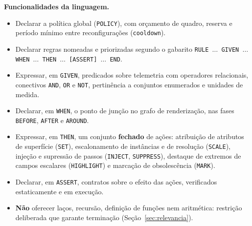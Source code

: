\documentclass[conference]{IEEEtran}
\begin{document}
\textbf{Funcionalidades da linguagem.}
\begin{itemize}
\item[\textbf{F1}] Declarar a política global (\texttt{POLICY}), com orçamento
de quadro, reserva e período mínimo entre reconfigurações
(\texttt{cooldown}).
\item[\textbf{F2}] Declarar regras nomeadas e priorizadas segundo o gabarito
\texttt{RULE $\dots$ GIVEN $\dots$ WHEN $\dots$ THEN $\dots$ [ASSERT] $\dots$
END}.
\item[\textbf{F3}] Expressar, em \texttt{GIVEN}, predicados sobre telemetria
com operadores relacionais, conectivos \texttt{AND}, \texttt{OR} e
\texttt{NOT}, pertinência a conjuntos enumerados e unidades de medida.
\item[\textbf{F4}] Declarar, em \texttt{WHEN}, o ponto de junção no grafo de
renderização, nas fases \texttt{BEFORE}, \texttt{AFTER} e \texttt{AROUND}.
\item[\textbf{F5}] Expressar, em \texttt{THEN}, um conjunto \textbf{fechado} de
ações: atribuição de atributos de superfície (\texttt{SET}), escalonamento de
instâncias e de resolução (\texttt{SCALE}), injeção e supressão de passos
(\texttt{INJECT}, \texttt{SUPPRESS}), destaque de extremos de campos escalares
(\texttt{HIGHLIGHT}) e marcação de obsolescência (\texttt{MARK}).
\item[\textbf{F6}] Declarar, em \texttt{ASSERT}, contratos sobre o efeito das
ações, verificados estaticamente e em execução.
\item[\textbf{F7}] \textbf{Não} oferecer laços, recursão, definição de funções
nem aritmética: restrição deliberada que garante terminação
(Seção~\ref{sec:relevancia}).
\end{itemize}
\end{document}
